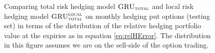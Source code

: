 \documentclass[letterpaper,12pt,titlepage,oneside,final]{book}
\numberwithin{equation}{section}
\theoremstyle{definition}
\newcommand{\modelT}{\textsc{GRU}_{\textsc{total}}}
\newcommand{\modelL}{\textsc{GRU}_{\textsc{total}}^{\textsc{local}}}
\begin{document}
\begin{figure}[htp!]
	\centering
	\caption{Comparing total risk hedging model $\modelT$ and local risk hedging model $\modelL$ on monthly hedging put options (testing set) in terms of the distribution of the  relative hedging portfolio value at the expiries as in equation \eqref{eq:relHError}. The distribution in this figure assumes we are on the sell-side of the option trading.} \label{fig:AppputTotalM1}
\end{figure}









 
\end{document}
